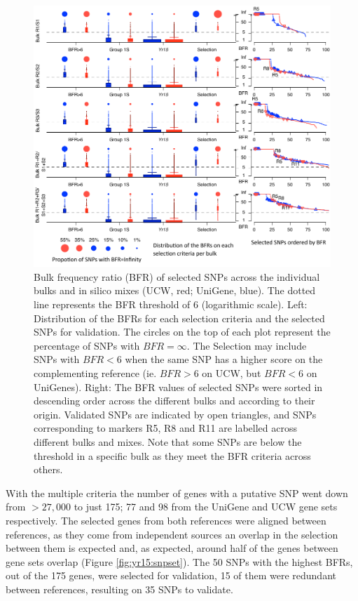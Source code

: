 \begin{figure}
\centering
\includegraphics[width=1\textwidth]{Yr15/Figures/selection/selectionDetals.pdf}
\caption{Bulk frequency ratio (BFR) of selected SNPs across the individual bulks and in silico mixes (UCW, red; UniGene, blue). The dotted line represents the BFR threshold of 6 (logarithmic scale). Left: Distribution of the BFRs for each selection criteria and the selected SNPs for validation. The circles on the top of each plot represent the percentage of SNPs with $BFR=\infty$. The Selection may include SNPs with $BFR<6$ when the same SNP has a higher score on the complementing reference (ie. $BFR>6$ on UCW, but $BFR<6$ on UniGenes). Right: The BFR values of selected SNPs were sorted in descending order across the different bulks and according to their origin. Validated SNPs are indicated by open triangles, and SNPs corresponding to markers R5, R8 and R11 are labelled across different bulks and mixes. Note that some SNPs are below the threshold in a specific bulk as they meet the BFR criteria across others. }
\label{fig:yr15:bfrDetailScore}
\end{figure}

With the multiple criteria the number of genes with a putative SNP went down from $>27,000$ to just 175; 77 and 98 from the UniGene and UCW gene sets respectively. 
The selected genes from both references were aligned between references, as they come from independent sources an overlap in the selection between them is expected and, as expected, around half of the genes between gene sets overlap (Figure \ref{fig:yr15:snpset}). 
The 50 SNPs with the highest BFRs, out of the 175 genes, were selected for validation, 15 of them were redundant between references, resulting on 35 SNPs to validate. 


